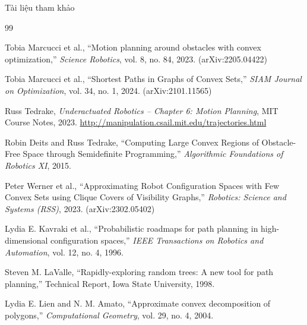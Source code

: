 \documentclass[aspectratio=169]{beamer}
\begin{document}
\begin{frame}[allowframebreaks]{Tài liệu tham khảo}
    \begin{thebibliography}{99}

        Tobia Marcucci et al., ``Motion planning around obstacles with convex optimization,'' \emph{Science Robotics}, vol. 8, no. 84, 2023. (arXiv:2205.04422)

        Tobia Marcucci et al., ``Shortest Paths in Graphs of Convex Sets,'' \emph{SIAM Journal on Optimization}, vol. 34, no. 1, 2024. (arXiv:2101.11565)

        Russ Tedrake, \emph{Underactuated Robotics -- Chapter 6: Motion Planning}, MIT Course Notes, 2023. \url{http://manipulation.csail.mit.edu/trajectories.html}

        Robin Deits and Russ Tedrake, ``Computing Large Convex Regions of Obstacle-Free Space through Semidefinite Programming,'' \emph{Algorithmic Foundations of Robotics XI}, 2015.

        Peter Werner et al., ``Approximating Robot Configuration Spaces with Few Convex Sets using Clique Covers of Visibility Graphs,'' \emph{Robotics: Science and Systems (RSS)}, 2023. (arXiv:2302.05402)


        Lydia E. Kavraki et al., ``Probabilistic roadmaps for path planning in high-dimensional configuration spaces,'' \emph{IEEE Transactions on Robotics and Automation}, vol. 12, no. 4, 1996.

        Steven M. LaValle, ``Rapidly-exploring random trees: A new tool for path planning,'' Technical Report, Iowa State University, 1998.

        Lydia E. Lien and N. M. Amato, ``Approximate convex decomposition of polygons,'' \emph{Computational Geometry}, vol. 29, no. 4, 2004.




\end{thebibliography}
\end{frame}
\end{document}
